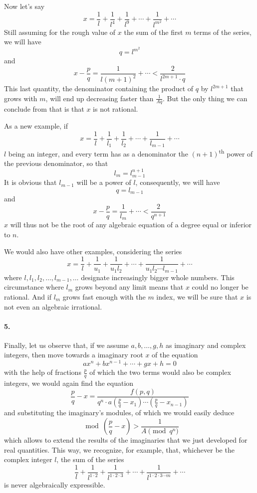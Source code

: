 \documentclass{article}
\begin{document}
Now let's say
  $$x = \frac{1}{l} + \frac{1}{l^4} + \frac{1}{l^9} + \cdots + \frac{1}{l^{m^2}}
    + \cdots$$
Still assuming for the rough value of $x$ the sum of the first $m$ terms of the
series, we will have
  $$q = l^{m^2}$$
and
  $$x - \frac{p}{q} = \frac{1}{l{(m + 1)}^2} + \cdots
    < \frac{2}{l^{2m+1}\cdot q}$$
This last quantity, the denominator containing the product of $q$ by $l^{2m+1}$
that grows with $m$, will end up decreasing faster than $\frac{1}{Aq}$. But the
only thing we can conclude from that is that $x$ is not rational.

As a new example, if
  $$x = \frac{1}{l} + \frac{1}{l_1} + \frac{1}{l_2} + \cdots
    + \frac{1}{l_{m-1}} + \cdots$$
$l$ being an integer, and every term has as a denominator the
$(n + 1)$\textsuperscript{th} power of the previous denominator, so that
  $$l_m = l_{m-1}^{n+1}$$
It is obvious that $l_{m-1}$ will be a power of $l$, consequently, we will have
  $$q = l_{m-1}$$
and
  $$x - \frac{p}{q}=\frac{1}{l_m}+\cdots < \frac{2}{q^{n+1}}$$
$x$ will thus not be the root of any algebraic equation of a degree equal or
inferior to $n$.

We would also have other examples, considering the series
  $$  x = \frac{1}{l} + \frac{1}{u_1} + \frac{1}{u_1 l_2} + \cdots
    + \frac{1}{u_1 l_2 \cdots l_{m-1}} + \cdots$$
where $l, l_1, l_2, \ldots, l_{m-1}, \ldots$ designate increasingly bigger whole
numbers. This circumstance where $l_m$ grows beyond any limit means that $x$
could no longer be rational. And if $l_m$ grows fast enough with the $m$ index,
we will be sure that $x$ is not even an algebraic irrational.

\paragraph{5.}
Finally, let us observe that, if we assume $a, b, \ldots, g, h$ as imaginary
and complex integers, then move towards a imaginary root $x$ of the equation
  $$ax^n + bx^{n-1} + \cdots + gx + h = 0$$
with the help of fractions $\frac{p}{q}$ of which the two terms would also be
complex integers, we would again find the equation
  $$\frac{p}{q} - x = \frac{f(p,q)}{q^n\cdot a\left(\frac{p}{q}
    - x_1\right)\cdots\left(\frac{p}{q}-x_{n-1}\right)}$$
and substituting the imaginary’s modules, of which we would easily deduce
  $$\mod\left(\frac{p}{q}- x\right) > \frac{1}{A\pmod{q}^n}$$
which allows to extend the results of the imaginaries that we just developed for
real quantities. This way, we recognize, for example, that, whichever be the
complex integer $l$, the sum of the series
$$\frac{1}{l} + \frac{1}{l^{1 \cdot 2}} + \frac{1}{l^{1\cdot 2\cdot 3}}
  + \cdots + \frac{1}{l^{1\cdot 2\cdot 3\cdots m}} + \cdots$$
is never algebraically expressible.
\end{document}
